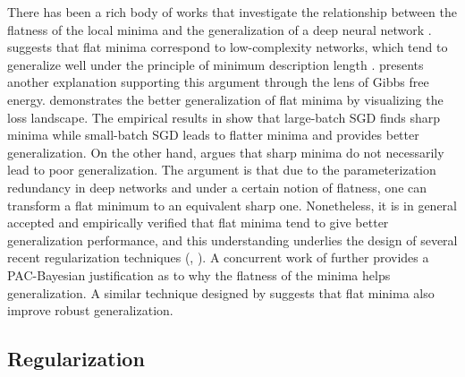 \documentclass[final]{cvpr}
\begin{document}
There has been a rich body of works that investigate the relationship between the flatness of the local minima and the generalization of a deep neural network \cite{chaudhari2017entropy,hochreiter1997flat,keskar2017large,li2018visualizing}. \cite{hochreiter1997flat} suggests that flat minima correspond to low-complexity networks, which tend to generalize well under the principle of minimum description length \cite{rissanen1978modeling}. \cite{chaudhari2017entropy} presents another explanation supporting this argument through the lens of Gibbs free energy. \cite{li2018visualizing} demonstrates the better generalization of flat minima by visualizing the loss landscape. The empirical results in \cite{keskar2017large} show that large-batch SGD finds sharp minima while small-batch SGD leads to flatter minima and provides better generalization. On the other hand, \cite{dinh2017sharp} argues that sharp minima do not necessarily lead to poor generalization. The argument is that due to the parameterization redundancy in deep networks and under a certain notion of flatness, one can transform a flat minimum to an equivalent sharp one. Nonetheless, it is in general accepted and empirically verified that flat minima tend to give better generalization performance, and this understanding underlies the design of several recent regularization techniques (\eg, \cite{ishida2020we,izmailov2018averaging}). A concurrent work of \cite{foret2021sharpness} further provides a PAC-Bayesian justification as to why the flatness of the minima helps generalization. A similar technique designed by \cite{wu2020adversarial} suggests that flat minima also improve robust generalization. 

\subsection{Regularization}
\end{document}
